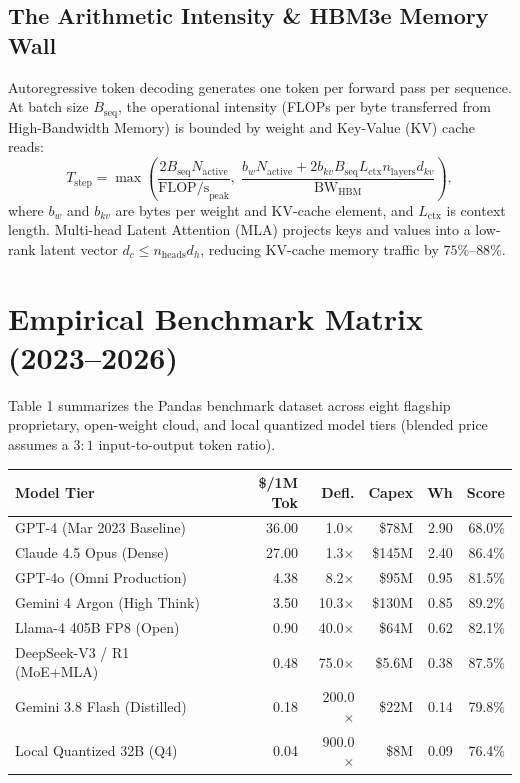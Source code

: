 \documentclass[11pt]{article}
\begin{document}
\subsection{The Arithmetic Intensity \& HBM3e Memory Wall}
Autoregressive token decoding generates one token per forward pass per sequence. At batch size $B_{\text{seq}}$, the operational intensity (FLOPs per byte transferred from High-Bandwidth Memory) is bounded by weight and Key-Value (KV) cache reads:
\begin{equation}
  T_{\text{step}} = \max\left( \frac{2 B_{\text{seq}} N_{\text{active}}}{\text{FLOP/s}_{\text{peak}}}, \; \frac{b_w N_{\text{active}} + 2 b_{kv} B_{\text{seq}} L_{\text{ctx}} n_{\text{layers}} d_{kv}}{\text{BW}_{\text{HBM}}} \right),
  \label{eq:roofline}
\end{equation}
where $b_w$ and $b_{kv}$ are bytes per weight and KV-cache element, and $L_{\text{ctx}}$ is context length. Multi-head Latent Attention (MLA) projects keys and values into a low-rank latent vector $d_c \leq n_{\text{heads}} d_h$, reducing KV-cache memory traffic by $75\%$--$88\%$.

\section{Empirical Benchmark Matrix (2023--2026)}
Table 1 summarizes the Pandas benchmark dataset across eight flagship proprietary, open-weight cloud, and local quantized model tiers (blended price assumes a $3:1$ input-to-output token ratio).

\begin{center}
\begin{tabular}{lrrrrr}
\hline
\textbf{Model Tier} & \textbf{\$/1M Tok} & \textbf{Defl.} & \textbf{Capex} & \textbf{Wh} & \textbf{Score} \\
\hline
GPT-4 (Mar 2023 Baseline) & 36.00 & 1.0$\times$ & \$78M & 2.90 & 68.0\% \\
Claude 4.5 Opus (Dense) & 27.00 & 1.3$\times$ & \$145M & 2.40 & 86.4\% \\
GPT-4o (Omni Production) & 4.38 & 8.2$\times$ & \$95M & 0.95 & 81.5\% \\
Gemini 4 Argon (High Think) & 3.50 & 10.3$\times$ & \$130M & 0.85 & 89.2\% \\
Llama-4 405B FP8 (Open) & 0.90 & 40.0$\times$ & \$64M & 0.62 & 82.1\% \\
DeepSeek-V3 / R1 (MoE+MLA) & 0.48 & 75.0$\times$ & \$5.6M & 0.38 & 87.5\% \\
Gemini 3.8 Flash (Distilled) & 0.18 & 200.0$\times$ & \$22M & 0.14 & 79.8\% \\
Local Quantized 32B (Q4) & 0.04 & 900.0$\times$ & \$8M & 0.09 & 76.4\% \\
\hline
\end{tabular}
\end{center}
\end{document}
